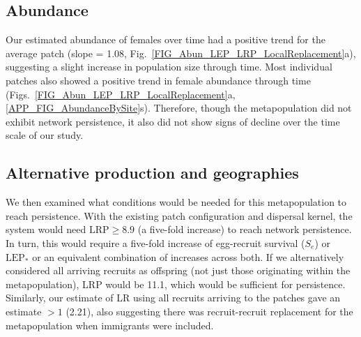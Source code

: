 \documentclass[12pt, oneside]{article}   	%
\begin{document}
\subsection*{Abundance}

Our estimated abundance of females over time had a positive trend for the average patch (slope = 1.08, Fig.\ \ref{FIG_Abun_LEP_LRP_LocalReplacement}a), suggesting a slight increase in population size through time. Most individual patches also showed a positive trend in female abundance through time (Figs.\ \ref{FIG_Abun_LEP_LRP_LocalReplacement}a, \ref{APP_FIG_AbundanceBySite}s). Therefore, though the metapopulation did not exhibit network persistence, it also did not show signs of decline over the time scale of our study. 



\subsection*{Alternative production and geographies}

We then examined what conditions would be needed for this metapopulation to reach persistence. With the existing patch configuration and dispersal kernel, the system would need $\text{LRP} \geq 8.9$ (a five-fold increase) to reach network persistence. In turn, this would require a five-fold increase of egg-recruit survival ($S_e$) or $\text{LEP}_*$ or an equivalent combination of increases across both. If we alternatively considered all arriving recruits as offspring (not just those originating within the metapopulation), LRP would be 11.1, which would be sufficient for persistence. Similarly, our estimate of LR using all recruits arriving to the patches gave an estimate $> 1$ (2.21), also suggesting there was recruit-recruit replacement for the metapopulation when immigrants were included. 
\end{document}
